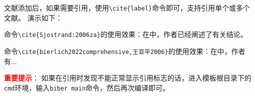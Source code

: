 文献添加后，如果需要引用，使用\verb|\cite{label}|命令即可，支持引用单个或多个文献。
演示如下：

命令\verb|\cite{Sjostrand:2006za}|的使用效果：在\cite{Sjostrand:2006za}中，作者已经阐述了有关结论。

命令\verb|\cite{bierlich2022comprehensive,王亚平2006}|的使用效果：在\cite{bierlich2022comprehensive,王亚平2006}中，作者有...

{\bf \textcolor{red}{重要提示}}：
如果在引用时发现不能正常显示引用标志的话，进入模板根目录下的\verb|cmd|环境，输入\verb|biber main|命令，然后再次编译即可。
